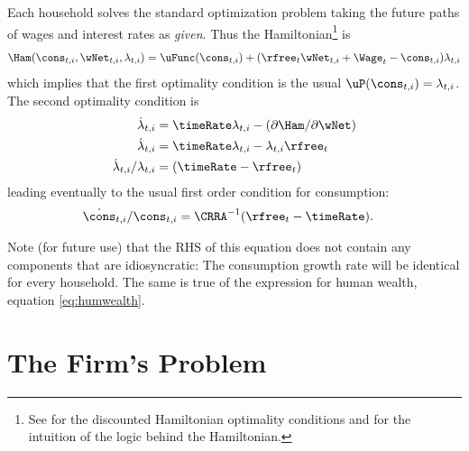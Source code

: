\documentclass{handout}
\begin{document}
Each household solves the standard optimization problem taking 
the future paths of wages and interest rates as {\it given}.  Thus
the Hamiltonian\footnote{See  for the discounted
Hamiltonian optimality conditions and  for the intuition
of the logic behind the Hamiltonian.} is
\begin{equation}
        \Ham(\cons_{t,i},\wNet_{t,i},\lambda_{t,i}) = \uFunc(\cons_{t,i}) + (\rfree_{t}\wNet_{t,i}+\Wage_{t}-\cons_{t,i})\lambda_{t,i}
\end{equation}
which implies that the first optimality condition is the usual $\uP(\cons_{t,i}) = \lambda_{t,i}$.
The second optimality condition is
\begin{equation}\begin{gathered}\begin{aligned}
        \dot{\lambda}_{t,i} & =  \timeRate \lambda_{t,i} - (\partial \Ham/\partial \wNet) \\
        \dot{\lambda}_{t,i} & =  \timeRate \lambda_{t,i} - \lambda_{t,i} \rfree_{t} \\
        \dot{\lambda}_{t,i}/\lambda_{t,i} & =   (\timeRate - \rfree_{t})
\end{aligned}\end{gathered}\end{equation}
leading eventually to the usual first order condition for consumption:
\begin{equation}\begin{gathered}\begin{aligned}
        \dot{\cons}_{t,i}/\cons_{t,i} & =  \CRRA^{-1}(\rfree_{t}-\timeRate) \label{eq:cdotindiv}.
\end{aligned}\end{gathered}\end{equation}

Note (for future use) that the RHS of this equation does not contain
any components that are idiosyncratic: The consumption growth rate will
be identical for every household.  The same is true of the expression
for human wealth, equation \eqref{eq:humwealth}.

\section{The Firm's Problem}
\end{document}
